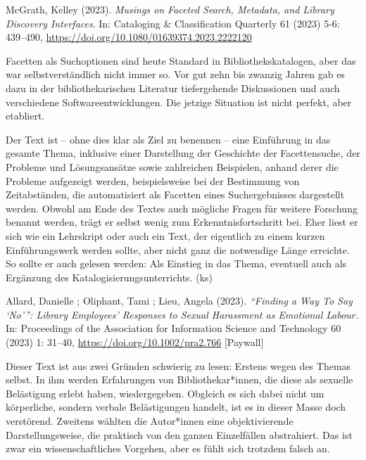 \documentclass[a4paper,
fontsize=11pt,
oneside,
numbers=noperiodatend,
parskip=half-,
bibliography=totoc,
final
]{scrartcl}
\begin{document}
McGrath, Kelley (2023). \emph{Musings on Faceted Search, Metadata, and
Library Discovery Interfaces}. In: Cataloging \& Classification
Quarterly 61 (2023) 5-6: 439--490,
\url{https://doi.org/10.1080/01639374.2023.2222120}

Facetten als Suchoptionen sind heute Standard in Bibliothekskatalogen,
aber das war selbstverständlich nicht immer so. Vor gut zehn bis zwanzig
Jahren gab es dazu in der bibliothekarischen Literatur tiefergehende
Diskussionen und auch verschiedene Softwareentwicklungen. Die jetzige
Situation ist nicht perfekt, aber etabliert.

Der Text ist -- ohne dies klar als Ziel zu benennen -- eine Einführung
in das gesamte Thema, inklusive einer Darstellung der Geschichte der
Facettensuche, der Probleme und Lösungsansätze sowie zahlreichen
Beispielen, anhand derer die Probleme aufgezeigt werden, beispielsweise
bei der Bestimmung von Zeitabständen, die automatisiert als Facetten
eines Suchergebnisses dargestellt werden. Obwohl am Ende des Textes auch
mögliche Fragen für weitere Forschung benannt werden, trägt er selbst
wenig zum Erkenntnisfortschritt bei. Eher liest er sich wie ein
Lehrskript oder auch ein Text, der eigentlich zu einem kurzen
Einführungswerk werden sollte, aber nicht ganz die notwendige Länge
erreichte. So sollte er auch gelesen werden: Als Einstieg in das Thema,
eventuell auch als Ergänzung des Katalogisierungsunterrichts. (ks)

Allard, Danielle ; Oliphant, Tami ; Lieu, Angela (2023).
\emph{\enquote{Finding a Way To Say \enquote*{No}}: Library Employees'
Responses to Sexual Harassment as Emotional Labour.} In: Proceedings of
the Association for Information Science and Technology 60 (2023) 1:
31--40, \url{https://doi.org/10.1002/pra2.766} {[}Paywall{]}

Dieser Text ist aus zwei Gründen schwierig zu lesen: Erstens wegen des
Themas selbst. In ihm werden Erfahrungen von Bibliothekar*innen, die
diese als sexuelle Belästigung erlebt haben, wiedergegeben. Obgleich es
sich dabei nicht um körperliche, sondern verbale Belästigungen handelt,
ist es in dieser Masse doch verstörend. Zweitens wählten die Autor*innen
eine objektivierende Darstellungsweise, die praktisch von den ganzen
Einzelfällen abstrahiert. Das ist zwar ein wissenschaftliches Vorgehen,
aber es fühlt sich trotzdem falsch an.
\end{document}

